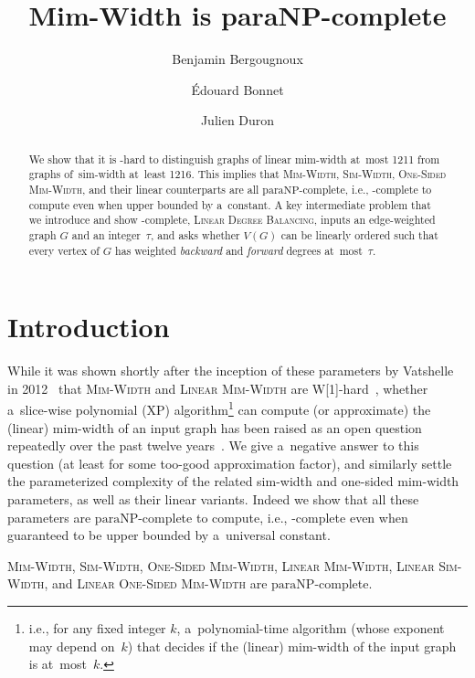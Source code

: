 \documentclass[a4paper,UKenglish,cleveref,hyperref,autoref]{lipics-v2021}
\title{Mim-Width is paraNP-complete}
\author{Benjamin Bergougnoux}{LIS, Aix-Marseille Université, France \and \url{https://benjaminbergougnoux.github.io/}}{benjamin.bergougnoux@gmail.com}{https://orcid.org/0000-0002-6270-3663}{}
\author{\'{E}douard Bonnet}{CNRS, ENS de Lyon, Universit\'e Claude Bernard Lyon 1, LIP UMR 5668, Lyon, France \and \url{http://perso.ens-lyon.fr/edouard.bonnet}}{edouard.bonnet@ens-lyon.fr}{https://orcid.org/0000-0002-1653-5822}{}
\author{Julien Duron}{ENS de Lyon, Universit\'e Claude Bernard Lyon 1, LIP UMR 5668, Lyon, France \and \url{http://perso.ens-lyon.fr/julien.duron}}{julien.duron@ens-lyon.fr}{https://orcid.org/0009-0004-0925-9438}{}
\newcommand{\paraNP}{\ensuremath{\mathrm{paraNP}}}
\begin{document}
\maketitle

\begin{abstract}
  We show that it is \NP-hard to distinguish graphs of linear mim-width at~most 1211 from graphs of~sim-width at~least 1216.
  This implies that \textsc{Mim-Width}, \textsc{Sim-Width}, \textsc{One-Sided Mim-Width}, and their linear counterparts are all \paraNP-complete, i.e., \NP-complete to compute even when upper bounded by a~constant.
  A key intermediate problem that we introduce and show \NP-complete, \textsc{Linear Degree Balancing}, inputs an edge-weighted graph $G$ and an integer~$\tau$, and asks whether $V(G)$ can be linearly ordered such that every vertex of $G$ has weighted \emph{backward} and \emph{forward} degrees at~most~$\tau$.
\end{abstract}

\section{Introduction}\label{sec:intro}

While it was shown shortly after the inception of these parameters by Vatshelle in 2012~\cite{Vatshelle12,BelmonteV13} that \textsc{Mim-Width} and \textsc{Linear Mim-Width} are W[1]-hard~\cite{SaetherV15,SaetherV16}, whether a~slice-wise polynomial (XP) algorithm\footnote{i.e., for any fixed integer $k$, a~polynomial-time algorithm (whose exponent may depend on~$k$) that decides if the (linear) mim-width of the input graph is at~most~$k$.} can compute (or approximate) the (linear) mim-width of an input graph has been raised as an open question repeatedly over the past twelve years~\cite{Vatshelle12,SaetherV16,JaffkeKT20,JaffkeKST19,BergougnouxPT22,BergougnouxKR23,OtachiST24,BergougnouxDJ23}.
We give a~negative answer to this question (at least for some too-good approximation factor), and similarly settle the parameterized complexity of the related sim-width and one-sided mim-width parameters, as well as their linear variants.
Indeed we show that all these parameters are \paraNP-complete to compute, i.e., \NP-complete even when guaranteed to be upper bounded by a~universal constant.

\begin{theorem}\label{thm:main-csq}
  \textsc{Mim-Width}, \textsc{Sim-Width}, \textsc{One-Sided Mim-Width}, \textsc{Linear Mim-Width}, \textsc{Linear Sim-Width}, and \textsc{Linear One-Sided Mim-Width} are \paraNP-complete.
\end{theorem}
\end{document}
